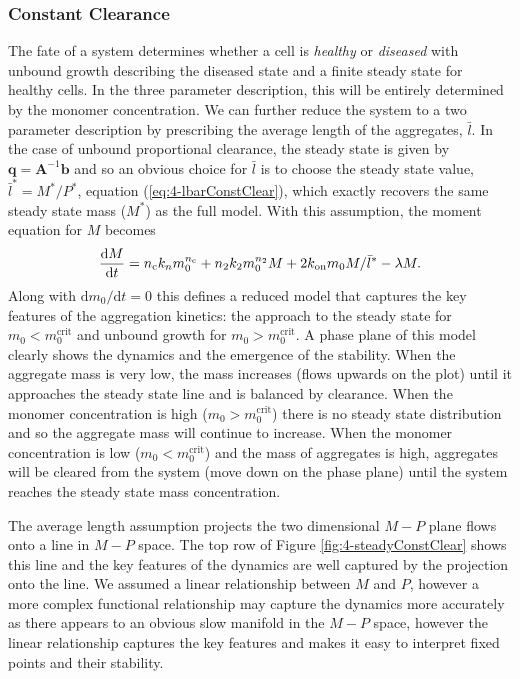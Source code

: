 \subsubsection{Constant Clearance}

The fate of a system determines whether a cell is \textit{healthy} or \textit{diseased} with unbound growth describing the diseased state and a finite steady state for healthy cells. In the three parameter description, this will be entirely determined by the monomer concentration. We can further reduce the system to a two parameter description by prescribing the average length of the aggregates, $\bar{l}$. In the case of unbound proportional clearance, the steady state is given by $\mathbf{q}=\mathbf{A}^{-1}\mathbf{b}$ and so an obvious choice for $\bar{l}$ is to choose the steady state value, $\bar{l}^*=M^*/P^*$, equation (\ref{eq:4-lbarConstClear}), which exactly recovers the same steady state mass ($M^*$) as the full model. With this assumption, the moment equation for $M$ becomes
\begin{equation}
    \frac{\text{d}M}{\text{d}t}= n_{\mathrm{c}} k_n m_0^{n_{\mathrm{c}}} + n_2 k_2 m_0^{n_2} M + 2 k_\text{on} m_0 M/\bar{l}^* - \lambda M.
    \label{eq:4-reducedConstClear}
\end{equation}
Along with $\text{d}m_0/\text{d}t=0$ this defines a reduced model that captures the key features of the aggregation kinetics: the approach to the steady state for $m_0 < m_0^{\text{crit}}$ and unbound growth for $m_0 > m_0^{\text{crit}}$. A phase plane of this model clearly shows the dynamics and the emergence of the stability. When the aggregate mass is very low, the mass increases (flows upwards on the plot) until it approaches the steady state line and is balanced by clearance. When the monomer concentration is high ($m_0>m_0^{\text{crit}}$) there is no steady state distribution and so the aggregate mass will continue to increase. When the monomer concentration is low ($m_0<m_0^{\text{crit}}$) and the mass of aggregates is high, aggregates will be cleared from the system (move down on the phase plane) until the system reaches the steady state mass concentration.

The average length assumption projects the two dimensional $M-P$ plane flows onto a line in $M-P$ space. The top row of Figure \ref{fig:4-steadyConstClear} shows this line and the key features of the dynamics are well captured by the projection onto the line. We assumed a linear relationship between $M$ and $P$, however a more complex functional relationship may capture the dynamics more accurately as there appears to an obvious slow manifold in the $M-P$ space, however the linear relationship captures the key features and makes it easy to interpret fixed points and their stability.

